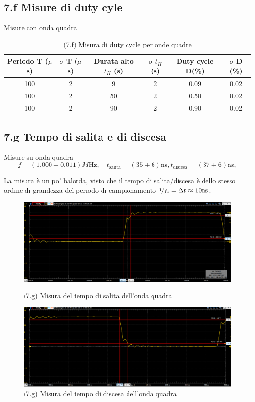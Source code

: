 \documentclass[10pt, a4paper, italian]{article}
\begin{document}
\subsection*{7.f Misure di duty cyle}
Misure con onda quadra
\begin{table}[h]
\centering
\begin{tabular}{|c|c|c|c|c|c|}
\hline 
Periodo T ($\mu$ s)& $\sigma$ T ($\mu$ s) & Durata alto $t_H$ (s) & $\sigma$ $t_H$ (s)
& Duty cycle D(\%) & $\sigma$ D (\%) \\
\hline 
100 & 2 & 9 & 2 & 0.09 & 0.02 \\
100 & 2 & 50 & 2 & 0.50 & 0.02 \\
100 & 2 & 90 & 2 & 0.90 & 0.02 \\
\hline 
\end{tabular} 
\caption{(7.f) Misura di duty cycle per onde quadre }
\end{table}


\subsection*{7.g Tempo di salita e di discesa}
Misure su onda quadra
\[
f = (1.000 \pm 0.011) \si{M\Hz}, \quad
t_\mathrm{salita} = (35 \pm 6) \mathrm{ns},
t_\mathrm{discesa} = (37 \pm 6) \mathrm{ns},
\]

La misura è un po' balorda, visto che il tempo di salita/discesa è dello
stesso ordine di grandezza del periodo di campionamento $\nicefrac{1}{f_s} = \Delta t \approx 10 \si{\ns}$.
\begin{figure}[htb]
\centering
\includegraphics[scale=0.4]{tempo_salita}
\caption{(7.g) Misura del tempo di salita dell'onda quadra }

\includegraphics[scale=0.4]{tempo_discesa}
\caption{(7.g) Misura del tempo di discesa dell'onda quadra }
\end{figure}
\end{document}
